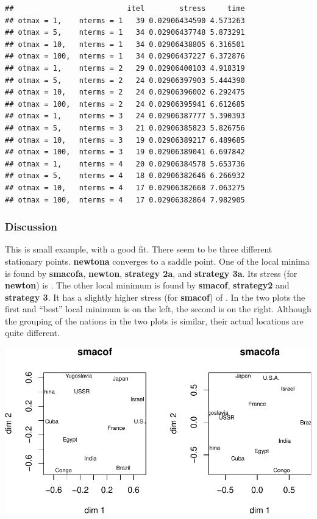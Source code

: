 \documentclass[
  12pt,
]{article}
\begin{document}
\begin{verbatim}
##                          itel        stress     time
## otmax = 1,    nterms = 1   39 0.02906434590 4.573263
## otmax = 5,    nterms = 1   34 0.02906437748 5.873291
## otmax = 10,   nterms = 1   34 0.02906438805 6.316501
## otmax = 100,  nterms = 1   34 0.02906437227 6.372876
## otmax = 1,    nterms = 2   29 0.02906400103 4.918319
## otmax = 5,    nterms = 2   24 0.02906397903 5.444390
## otmax = 10,   nterms = 2   24 0.02906396002 6.292475
## otmax = 100,  nterms = 2   24 0.02906395941 6.612685
## otmax = 1,    nterms = 3   24 0.02906387777 5.390393
## otmax = 5,    nterms = 3   21 0.02906385823 5.826756
## otmax = 10,   nterms = 3   19 0.02906389217 6.489685
## otmax = 100,  nterms = 3   19 0.02906389041 6.697842
## otmax = 1,    nterms = 4   20 0.02906384578 5.653736
## otmax = 5,    nterms = 4   18 0.02906382646 6.266932
## otmax = 10,   nterms = 4   17 0.02906382668 7.063275
## otmax = 100,  nterms = 4   17 0.02906382864 7.982905
\end{verbatim}

\subsubsection{Discussion}\label{discussion-5}

This is small example, with a good fit. There seem to be three different stationary points.
\textbf{newtona} converges to a saddle point. One of the local minima is found by
\textbf{smacofa}, \textbf{newton}, \textbf{strategy 2a}, and \textbf{strategy 3a}. Its stress (for \textbf{newton}) is . The other local minimum is found by
\textbf{smacof}, \textbf{strategy2} and \textbf{strategy 3}. It has a slightly higher stress (for \textbf{smacof}) of . In the two plots the first and ``best'' local minimum is on the
left, the second is on the right. Although the grouping of the nations in the two plots
is similar, their actual locations are quite different.

\includegraphics{mSmacof_files/figure-latex/wishplot-1.pdf}
\end{document}
